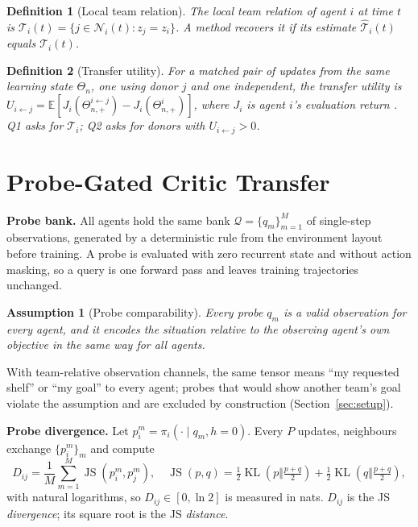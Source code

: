 \documentclass{article}
\newtheorem{assumption}{Assumption}
\newtheorem{definition}{Definition}
\theoremstyle{remark}
\newcommand{\JS}{\operatorname{JS}}
\newcommand{\KL}{\operatorname{KL}}
\begin{document}
\begin{definition}[Local team relation]
The local team relation of agent $i$ at time $t$ is $\mathcal{T}_i(t)=\{j\in\mathcal{N}_i(t): z_j=z_i\}$. A method recovers it
if its estimate $\hat{\mathcal{T}}_i(t)$ equals $\mathcal{T}_i(t)$.
\end{definition}

\begin{definition}[Transfer utility]
For a matched pair of updates from the same learning state $\Theta_n$, one using donor $j$ and one independent, the
transfer utility is $U_{i\leftarrow j}=\mathbb{E}[J_i(\Theta^{i\leftarrow j}_{n,+})-J_i(\Theta^{i}_{n,+})]$, where $J_i$ is
agent $i$'s evaluation return \cite{agarwal2021precipice}. Q1 asks for $\mathcal{T}_i$; Q2 asks for donors with
$U_{i\leftarrow j}>0$.
\end{definition}

\section{Probe-Gated Critic Transfer}
\label{sec:method}
\textbf{Probe bank.} All agents hold the same bank $\mathcal{Q}=\{q_m\}_{m=1}^{M}$ of single-step observations, generated by a
deterministic rule from the environment layout before training. A probe is evaluated with zero recurrent state and without
action masking, so a query is one forward pass and leaves training trajectories unchanged.

\begin{assumption}[Probe comparability]
\label{as:comparability}
Every probe $q_m$ is a valid observation for every agent, and it encodes the situation relative to the observing agent's
own objective in the same way for all agents.
\end{assumption}
With team-relative observation channels, the same tensor means ``my requested shelf'' or ``my goal'' to every agent;
probes that would show another team's goal violate the assumption and are excluded by construction (Section~\ref{sec:setup}).

\textbf{Probe divergence.} Let $p_i^m=\pi_i(\cdot\mid q_m,h=0)$. Every $P$ updates, neighbours exchange $\{p_i^m\}_m$ and compute
\begin{equation}
  D_{ij}=\frac{1}{M}\sum_{m=1}^{M}\JS(p_i^m,p_j^m),\quad
  \JS(p,q)=\tfrac12\KL(p\Vert\tfrac{p+q}{2})+\tfrac12\KL(q\Vert\tfrac{p+q}{2}),
  \label{eq:div}
\end{equation}
with natural logarithms, so $D_{ij}\in[0,\ln 2]$ is measured in nats. $D_{ij}$ is the JS \emph{divergence}; its square root
is the JS \emph{distance}.
\end{document}
